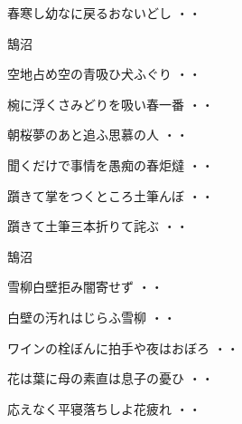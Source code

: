 \begin{shiika}春寒し幼なに戻るおないどし
\hfill{・・}\end{shiika}
\vspace{0.6cm}
鵠沼
\begin{shiika}空地占め空の青吸ひ犬ふぐり
\hfill{・・}\end{shiika}
\begin{shiika}椀に浮くさみどりを吸い春一番
\hfill{・・}\end{shiika}
\begin{shiika}朝桜夢のあと追ふ思慕の人
\hfill{・・}\end{shiika}
\vspace{0.6cm}
\begin{shiika}聞くだけで事情を愚痴の春炬燵
\hfill{・・}\end{shiika}
\begin{shiika}躓きて掌をつくところ土筆んぼ
\hfill{・・}\end{shiika}
\begin{shiika}躓きて土筆三本折りて詫ぶ
\hfill{・・}\end{shiika}
\vspace{0.6cm}
鵠沼
\begin{shiika}雪柳白壁拒み闇寄せず
\hfill{・・}\end{shiika}
\vspace{0.6cm}
\begin{shiika}白壁の汚れはじらふ雪柳
\hfill{・・}\end{shiika}
\vspace{0.6cm}
\begin{shiika}ワインの栓ぼんに拍手や夜はおぼろ
\hfill{・・}\end{shiika}
\vspace{0.6cm}
\begin{shiika}花は葉に母の素直は息子の憂ひ
\hfill{・・}\end{shiika}
\vspace{0.6cm}
\begin{shiika}応えなく平寝落ちしよ花疲れ
\hfill{・・}\end{shiika}
\vspace{0.6cm}
